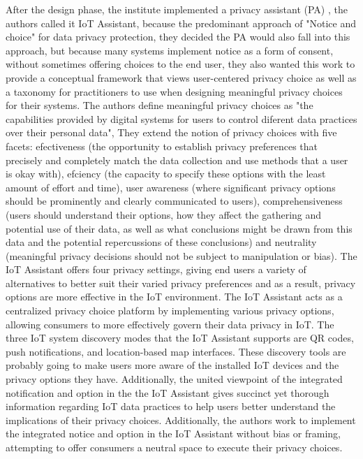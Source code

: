 \documentclass[conference]{IEEEtran}
\begin{document}
After the design phase, the institute implemented a privacy assistant (PA) \cite{FengDesign},
the authors called it IoT Assistant, because the predominant approach of
"Notice and choice" for data privacy protection, they decided the PA would
also fall into this approach, but because many systems implement notice as
a form of consent, without sometimes offering choices to the end user, they
also wanted this work to provide a conceptual framework that views user-centered
privacy choice as well as a taxonomy for practitioners to use when designing meaningful
privacy choices for their systems. The authors define
meaningful privacy choices as "the capabilities provided by digital
systems for users to control diferent data practices over their personal data", They
extend the notion of privacy choices with five facets: efectiveness (the opportunity to
establish privacy preferences that precisely and completely match the data
collection and use methods that a user is okay with), efciency
(the capacity to specify these options with the least amount of effort and time),
user awareness (where significant privacy options should be prominently and clearly
communicated to users), comprehensiveness (users should understand their options,
how they affect the gathering and potential use of their data, as well as what
conclusions might be drawn from this data and the potential repercussions of
these conclusions) and neutrality (meaningful privacy decisions should not be
subject to manipulation or bias). The IoT Assistant offers four privacy settings, giving end users
a variety of alternatives to better suit their varied privacy preferences and as a result,
privacy options are more effective in the IoT environment. The IoT Assistant acts as a
centralized privacy choice platform by implementing various privacy options, allowing
consumers to more effectively govern their data privacy in IoT. The three IoT system
discovery modes that the IoT Assistant supports are QR codes, push notifications,
and location-based map interfaces. These discovery tools are probably going to make
users more aware of the installed IoT devices and the privacy options they have.
Additionally, the united viewpoint of the integrated notification and option in the
the IoT Assistant gives succinct yet thorough information regarding IoT data practices to help users
better understand the implications of their privacy choices. Additionally, the authors
work to implement the integrated notice and option in the IoT Assistant without bias or framing,
attempting to offer consumers a neutral space to execute their privacy choices.
\end{document}
